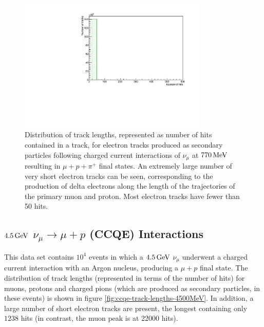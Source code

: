 \begin{figure}
\centering
\includegraphics[angle=-90,width=0.8\textwidth]{chapters/particleid_images/ccpi-770-electron-lengths}
\caption[Track length distribution for $e^{-}$ from $770\MeV$ neutrinos (CCPi)]{\label{fig:ccpi-electron-lengths-770MeV}Distribution of track lengths, represented as number of hits contained in a track, for electron tracks produced as secondary particles following charged current interactions of $\nu_\mu$ at $770\MeV$ resulting in $\mu + p + \pi^+$ final states. An extremely large number of very short electron tracks can be seen, corresponding to the production of delta electrons along the length of the trajectories of the primary muon and proton. Most electron tracks have fewer than 50 hits.}
\end{figure}

\subsection{$4.5\,\mathrm{GeV}$ $\nu_\mu \rightarrow \mu + p$ (CCQE) Interactions}
This data set contains $10^4$ events in which a $4.5\,\mathrm{GeV}$ $\nu_\mu$ underwent a charged current interaction with an Argon nucleus, producing a $\mu + p$ final state. The distribution of track lengths (represented in terms of the number of hits) for muons, protons and charged pions (which are produced as secondary particles, in these events) is shown in figure \ref{fig:ccqe-track-lengths-4500MeV}. In addition, a large number of short electron tracks are present, the longest containing only $1238$ hits (in contrast, the muon peak is at 22000 hits).

